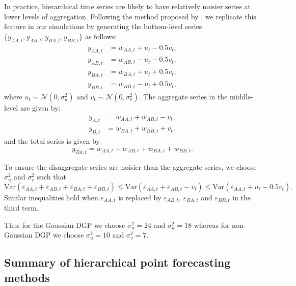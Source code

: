 \documentclass[12pt]{article}
\def\var{\text{Var}}
\theoremstyle{definition}
\begin{document}
In practice, hierarchical time series are likely to have relatively noisier series at lower levels of aggregation. Following the method proposed by \citet{WicEtAl2019}, we replicate this feature in our simulations by generating the bottom-level series $\{y_{AA,t},y_{AB,t},y_{BA,t},y_{BB,t}\}$ as follows:
\begin{align*}
y_{AA,t} &= w_{AA,t} + u_t - 0.5v_t,\\
y_{AB,t} &= w_{AB,t} - u_t - 0.5v_t,\\
y_{BA,t} &= w_{BA,t} + u_t + 0.5v_t,\\
y_{BB,t} &= w_{BB,t} - u_t + 0.5v_t,
\end{align*}
where $u_t \sim \mathcal{N}(0,\sigma^2_u)$ and $v_t \sim \mathcal{N}(0,\sigma^2_v)$. The aggregate series in the middle-level are given by:
\begin{align*}
y_{A,t} &= w_{AA,t} + w_{AB,t} - v_t,\\
y_{B,t} &= w_{BA,t} + w_{BB,t} + v_t,
\end{align*}
and the total series is given by
\[
y_{Tot,t} = w_{AA,t} + w_{AB,t} + w_{BA,t} + w_{BB,t}.
\]


To ensure the disaggregate series are noisier than the aggregate series, we choose $\sigma^2_u$ and $\sigma^2_v$ such that
\[
\var(\varepsilon_{AA,t} + \varepsilon_{AB,t} + \varepsilon_{BA,t} + \varepsilon_{BB,t})
\le \var(\varepsilon_{AA,t}+\varepsilon_{AB,t}-v_t)
\le \var(\varepsilon_{AA,t}+u_t-0.5v_t).
\]
Similar inequalities hold when $\varepsilon_{AA,t}$ is replaced by $\varepsilon_{AB,t}$, $\varepsilon_{BA,t}$ and $\varepsilon_{BB,t}$ in the third term.

Thus for the Gaussian DGP we choose $\sigma^2_u = 24$ and $\sigma^2_u = 18$ whereas for non-Gaussian DGP we choose $\sigma^2_u = 10$ and $\sigma^2_v = 7$.

\subsection{Summary of hierarchical point forecasting methods}
\end{document}
